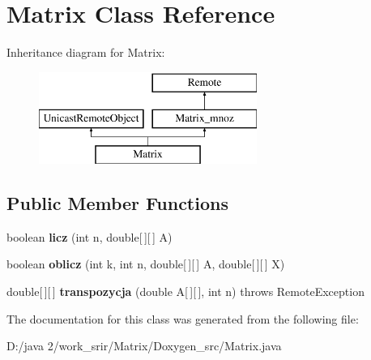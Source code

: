\hypertarget{class_matrix}{}\section{Matrix Class Reference}
\label{class_matrix}
Inheritance diagram for Matrix\+:\begin{figure}[H]
\begin{center}
\leavevmode
\includegraphics[height=3.000000cm]{class_matrix}
\end{center}
\end{figure}
\subsection*{Public Member Functions}
\begin{DoxyCompactItemize}
\item 
\hypertarget{class_matrix_a20d3fe31c44ec0cb91bdbd5f093cf9aa}{}boolean {\bfseries licz} (int n, double\mbox{[}$\,$\mbox{]}\mbox{[}$\,$\mbox{]} A)\label{class_matrix_a20d3fe31c44ec0cb91bdbd5f093cf9aa}

\item 
\hypertarget{class_matrix_a6bdc81171a0fa46d12295cd70e3eb0f5}{}boolean {\bfseries oblicz} (int k, int n, double\mbox{[}$\,$\mbox{]}\mbox{[}$\,$\mbox{]} A, double\mbox{[}$\,$\mbox{]}\mbox{[}$\,$\mbox{]} X)\label{class_matrix_a6bdc81171a0fa46d12295cd70e3eb0f5}

\item 
\hypertarget{class_matrix_a603f88c2a9748145f46ae1bf4320f135}{}double\mbox{[}$\,$\mbox{]}\mbox{[}$\,$\mbox{]} {\bfseries transpozycja} (double A\mbox{[}$\,$\mbox{]}\mbox{[}$\,$\mbox{]}, int n)  throws Remote\+Exception \label{class_matrix_a603f88c2a9748145f46ae1bf4320f135}

\end{DoxyCompactItemize}


The documentation for this class was generated from the following file\+:\begin{DoxyCompactItemize}
\item 
D\+:/java 2/work\+\_\+srir/\+Matrix/\+Doxygen\+\_\+src/Matrix.\+java\end{DoxyCompactItemize}
